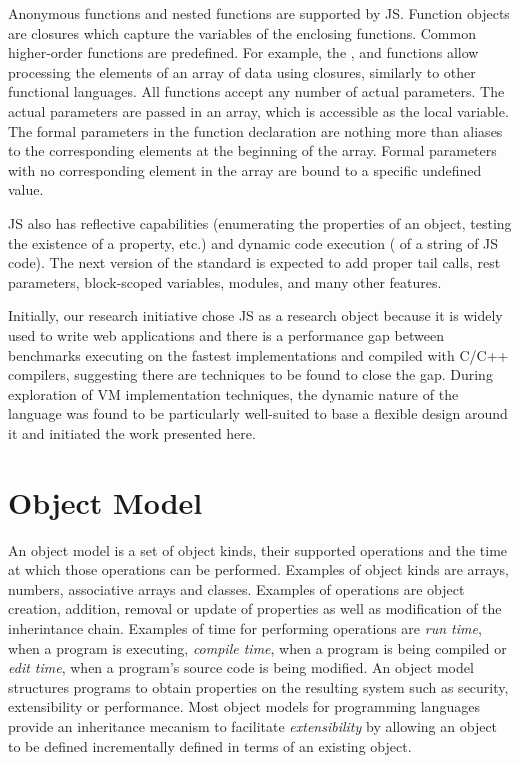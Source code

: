 Anonymous functions and nested functions are supported by JS. Function objects
are closures which capture the variables of the enclosing functions. Common
higher-order functions are predefined. For example, the , 
and  functions allow processing the elements of an array of data
using closures, similarly to other functional languages. All functions accept
any number of actual parameters. The actual parameters are passed in an array,
which is accessible as the  local variable. The formal parameters
in the function declaration are nothing more than aliases to the corresponding
elements at the beginning of the array. Formal parameters with no corresponding
element in the array are bound to a specific undefined value.

JS also has reflective capabilities (enumerating the properties of an object,
testing the existence of a property, etc.) and dynamic code execution
( of a string of JS code).  The next version of the standard is
expected to add proper tail calls, rest parameters, block-scoped variables,
modules, and many other features.

Initially, our research initiative chose JS as a research object because it is
widely used to write web applications and there is a performance gap between
benchmarks executing on the fastest implementations and compiled with C/C++
compilers, suggesting there are techniques to be found to close the gap.
During exploration of VM implementation techniques, the dynamic nature of the
language was found to be particularly well-suited to base a flexible design
around it and initiated the work presented here.

\section{Object Model}

An object model is a set of object kinds, their supported operations and the
time at which those operations can be performed.  Examples of object kinds are
arrays, numbers, associative arrays and classes.  Examples of operations are
object creation, addition, removal or update of properties as well as
modification of the inherintance chain. Examples of time for performing
operations are \textit{run time}, when a program is executing, \textit{compile
time}, when a program is being compiled or \textit{edit time}, when a program's
source code is being modified. An object model structures programs to obtain
properties on the resulting system such as security, extensibility or
performance. Most object models for programming languages provide an
inheritance mecanism to facilitate \textit{extensibility} by allowing an object
to be defined incrementally defined in terms of an existing object.


